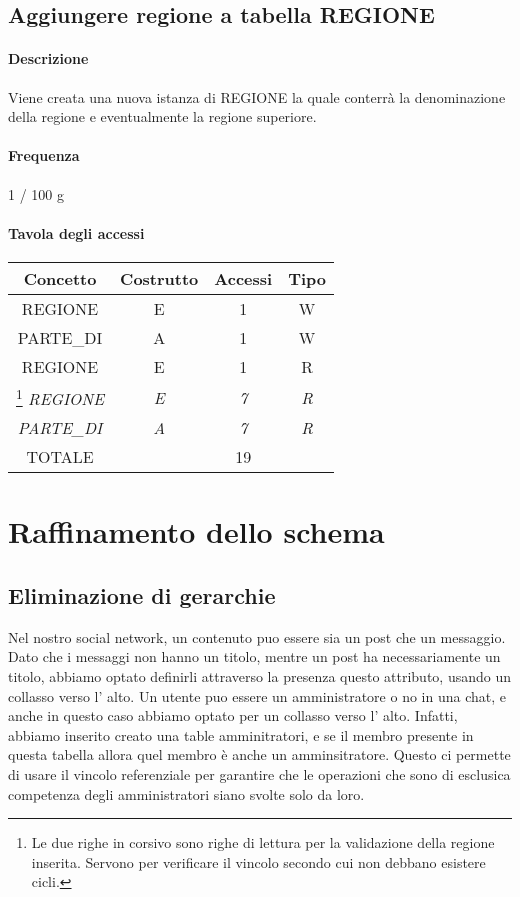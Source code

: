 \documentclass[a4paper,12pt]{report}
\begin{document}
\subsection{Aggiungere regione a tabella REGIONE} \label{aggiungere_regione}
\paragraph{Descrizione} Viene creata una nuova istanza di REGIONE la quale conterrà la denominazione della regione e eventualmente la regione superiore.
\paragraph{Frequenza} 1 / 100 g
\begin{table}[H]
\paragraph{Tavola degli accessi\newline}
\begin{tabular}{|c|c|c|c|}
\hline
Concetto           & Costrutto  & Accessi    & Tipo       \\ \hline
REGIONE            & E          & 1          & W          \\ \hline
PARTE\_DI          & A          & 1          & W          \\ \hline
REGIONE            & E          & 1          & R          \\ \hline
\footnote{Le due righe in corsivo sono righe di lettura per la validazione della regione inserita. Servono per verificare il vincolo secondo cui non debbano esistere cicli.}
\textit{REGIONE}   & \textit{E} & \textit{7} & \textit{R} \\ \hline
\textit{PARTE\_DI} & \textit{A} & \textit{7} & \textit{R} \\ \hline
TOTALE             &            & 19         &            \\ \hline
\end{tabular}
\end{table}
\section{Raffinamento dello schema}
\subsection{Eliminazione di gerarchie}
Nel nostro social network, un contenuto puo essere sia un 
post che un messaggio. Dato che i messaggi non hanno un titolo, mentre un post ha necessariamente un titolo, 
abbiamo optato definirli attraverso la presenza questo attributo, usando un collasso verso l' alto.
Un utente puo essere un amministratore o no in una chat, e anche in questo caso abbiamo optato per un collasso verso 
l' alto. Infatti, abbiamo inserito creato una table amminitratori, e se il membro presente in questa tabella allora quel membro è anche un amminsitratore. Questo ci permette di usare il vincolo referenziale per garantire che le operazioni che sono di esclusica competenza degli amministratori siano svolte solo da loro. 
\end{document}
